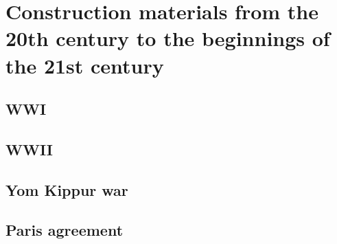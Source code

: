 \section{Construction materials from the 20th century to the beginnings of the 21st century}
\label{sec:construction_materials}

\subsection{WWI}
\label{sec:wwi}

\subsection{WWII}
\label{sec:wwii}

\subsection{Yom Kippur war}
\label{sec:yom_kippur_war}

\subsection{Paris agreement}
\label{sec:paris_agreement}

